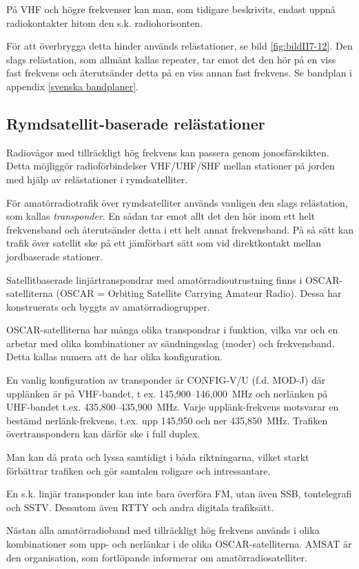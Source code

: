 På VHF och högre frekvenser kan man, som tidigare beskrivits, endast
uppnå radiokontakter hitom den s.k. radiohorisonten.

För att överbrygga detta hinder används relästationer, se bild
\ref{fig:bildII7-12}. Den slags
relästation, som allmänt kallas repeater, tar emot det den hör på en
viss fast frekvens och återutsänder detta på en viss annan fast
frekvens. Se bandplan i appendix \ref{svenska bandplaner}.

\subsection{Rymdsatellit-baserade relästationer}

Radiovågor med tillräckligt hög frekvens kan passera genom
jonosfärskikten. Detta möjliggör radioförbindelser VHF/UHF/SHF mellan
stationer på jorden med hjälp av relästationer i rymdsatelliter.

För amatörradiotrafik över rymdsatelliter används vanligen den slags
relästation, som kallas \emph{transponder}. En sådan tar emot allt det
den hör inom ett helt frekvensband och återutsänder detta i ett helt
annat frekvensband. På så sätt kan trafik över satellit ske på ett
jämförbart sätt som vid direktkontakt mellan jordbaserade stationer.

Satellitbaserade linjärtranspondrar med amatörradioutrustning finns i
OSCAR-satelliterna (OSCAR = Orbiting Satellite Carrying Amateur
Radio). Dessa har konstruerats och byggts av amatörradiogrupper.

OSCAR-satelliterna har många olika transpondrar i funktion, vilka var
och en arbetar med olika kombinationer av sändningsslag (moder) och
frekvensband. Detta kallas numera att de har olika konfiguration.

En vanlig konfiguration av transponder är CONFIG-V/U (f.d. MOD-J) där
upplänken är på VHF-bandet, t ex. 145,900--146,000~MHz och nerlänken på
UHF-bandet t.ex.  435,800--435,900~MHz. Varje upplänk-frekvens
motsvarar en bestämd nerlänk-frekvens, t.ex. upp 145,950 och ner
435,850~MHz. Trafiken övertranspondern kan därför ske i full duplex.

Man kan då prata och lyssa samtidigt i båda riktningarna, vilket
starkt förbättrar trafiken och gör samtalen roligare och
intressantare.

En s.k. linjär transponder kan inte bara överföra FM, utan även SSB,
tontelegrafi och SSTV. Dessutom även RTTY och andra digitala
trafiksätt.

Nästan alla amatörradioband med tillräckligt hög frekvens används i
olika kombinationer som upp- och nerlänkar i de olika
OSCAR-satelliterna. AMSAT är den organisation, som fortlöpande
informerar om amatörradiosatelliter.

